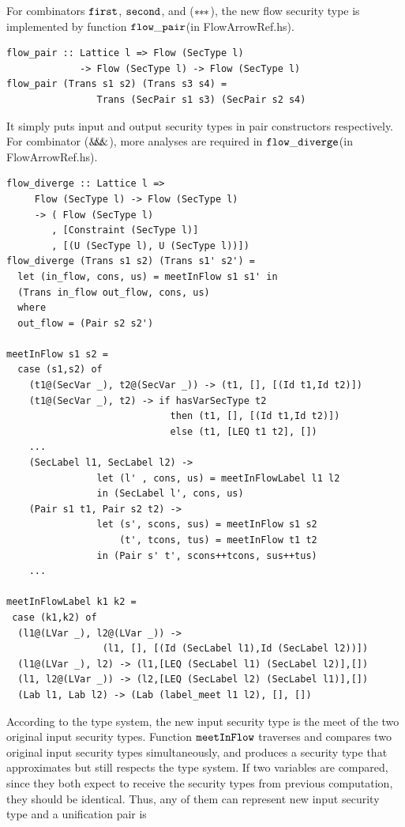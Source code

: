 \documentclass[a4paper]{report}
\newcommand{\arrowop}[1]{$#1\negthickspace #1\negthickspace #1$}
\newcommand{\co}[1]{$\cod{#1}$}
\begin{document}
For combinators \co{first}, \co{second}, and (\arrowop{*}), the new flow security type is implemented by 
function \co{flow\_pair}(in FlowArrowRef.hs). 
\begin{Verbatim}[fontsize=\footnotesize]
flow_pair :: Lattice l => Flow (SecType l) 
             -> Flow (SecType l) -> Flow (SecType l)
flow_pair (Trans s1 s2) (Trans s3 s4) = 
                Trans (SecPair s1 s3) (SecPair s2 s4)
\end{Verbatim}
It simply puts input and output security types in pair constructors respectively.
For combinator (\arrowop{\&}), more analyses are required 
in \co{flow\_diverge}(in FlowArrowRef.hs).
\begin{Verbatim}[fontsize=\footnotesize]
flow_diverge :: Lattice l => 
     Flow (SecType l) -> Flow (SecType l)
     -> ( Flow (SecType l)
        , [Constraint (SecType l)]
        , [(U (SecType l), U (SecType l))])
flow_diverge (Trans s1 s2) (Trans s1' s2') =
  let (in_flow, cons, us) = meetInFlow s1 s1' in
  (Trans in_flow out_flow, cons, us)
  where
  out_flow = (Pair s2 s2')

meetInFlow s1 s2 =
  case (s1,s2) of
    (t1@(SecVar _), t2@(SecVar _)) -> (t1, [], [(Id t1,Id t2)])
    (t1@(SecVar _), t2) -> if hasVarSecType t2
                             then (t1, [], [(Id t1,Id t2)])
                             else (t1, [LEQ t1 t2], [])
    ...
    (SecLabel l1, SecLabel l2) -> 
                let (l' , cons, us) = meetInFlowLabel l1 l2
                in (SecLabel l', cons, us)
    (Pair s1 t1, Pair s2 t2) -> 
                let (s', scons, sus) = meetInFlow s1 s2
                    (t', tcons, tus) = meetInFlow t1 t2
                in (Pair s' t', scons++tcons, sus++tus)
    ...

meetInFlowLabel k1 k2 =
 case (k1,k2) of
  (l1@(LVar _), l2@(LVar _)) -> 
                 (l1, [], [(Id (SecLabel l1),Id (SecLabel l2))])
  (l1@(LVar _), l2) -> (l1,[LEQ (SecLabel l1) (SecLabel l2)],[])
  (l1, l2@(LVar _)) -> (l2,[LEQ (SecLabel l2) (SecLabel l1)],[])
  (Lab l1, Lab l2) -> (Lab (label_meet l1 l2), [], [])
\end{Verbatim}
According to the type system, the new input security type is the meet of the two original input security types.
Function \co{meetInFlow} traverses and compares two original input security types simultaneously, 
and produces a security type that approximates but still respects the type system.
If two variables are compared, since they both expect to receive the security types from previous computation,
they should be identical. Thus, any of them can represent new input security type and a unification pair is 
\end{document}
